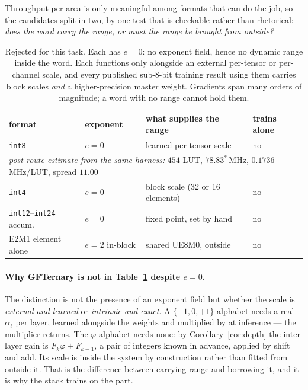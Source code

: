 \documentclass[11pt]{article}
\theoremstyle{definition}
\begin{document}
\label{sec:untrainable}

Throughput per area is only meaningful among formats that can do the job, so the
candidates split in two, by one test that is checkable rather than rhetorical:
\emph{does the word carry the range, or must the range be brought from outside?}

\begin{table}[t]\centering
\caption{Rejected for this task. Each has $e=0$: no exponent field, hence no
dynamic range inside the word. Each functions only alongside an external
per-tensor or per-channel scale, and every published sub-8-bit training result
using them carries block scales \emph{and} a higher-precision master weight.
Gradients span many orders of magnitude; a word with no range cannot hold them.}
\label{tab:rejected}
\small\setlength{\tabcolsep}{4pt}
\begin{tabular}{llll}
\toprule
format & exponent & what supplies the range & trains alone \\
\midrule
\texttt{int8} & $e=0$ & learned per-tensor scale & no \\
\multicolumn{4}{l}{\quad\emph{post-route estimate from the same harness:} $454$ LUT, $78.83^{\ast}$\,MHz, $0.1736$ MHz/LUT, spread $11.00$} \\
\texttt{int4} & $e=0$ & block scale (32 or 16 elements) & no \\
\texttt{int12}--\texttt{int24} accum. & $e=0$ & fixed point, set by hand & no \\
E2M1 element alone & $e=2$ in-block & shared UE8M0, outside & no \\
\bottomrule
\end{tabular}
\end{table}

\paragraph{Why GFTernary is not in Table~\ref{tab:rejected} despite $e=0$.}
The distinction is not the presence of an exponent field but whether the scale is
\emph{external and learned} or \emph{intrinsic and exact}. A $\{-1,0,+1\}$
alphabet needs a real $\alpha_\ell$ per layer, learned alongside the weights and
multiplied by at inference --- the multiplier returns. The $\varphi$ alphabet
needs none: by Corollary~\ref{cor:depth} the inter-layer gain is
$F_k\varphi + F_{k-1}$, a pair of integers known in advance, applied by shift and
add. Its scale is inside the system by construction rather than fitted from
outside it. That is the difference between carrying range and borrowing it, and
it is why the stack trains on the part.
\end{document}
